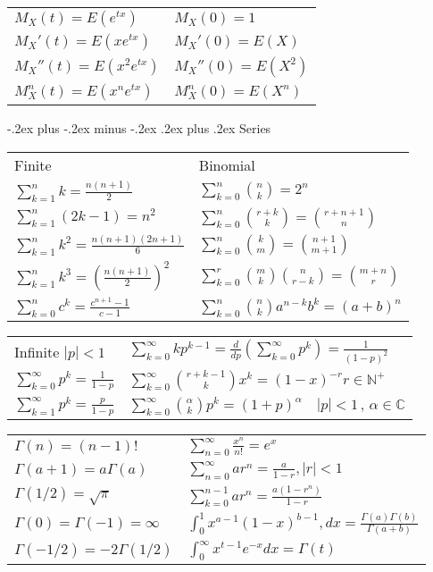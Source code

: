 \documentclass[10pt,landscape]{article}
\makeatletter
\renewcommand{\subsubsection}{\@startsection{subsubsection}{3}{0mm}%
                                {-.2ex plus -.2ex minus -.2ex}%
                                {.2ex plus .2ex}%
                                {\normalfont\small\bfseries}}
\makeatother
\begin{document}
\begin{multicols}{1}
\begin{tabular}{ l|l }
$M_X(t)=E(e^{tx})$   & $M_X(0)=1$ \\
$M_X'(t)=E(xe^{tx})$  & $M_X'(0)=E(X)$  \\ 
$M_X''(t)=E(x^2e^{tx})$ & $M_X''(0)=E(X^2)$ \\
$M_X^n(t)=E(x^ne^{tx})$ & $M_X^n(0)=E(X^n)$
\end{tabular}

  \subsubsection{Series}

\begin{tabular}{ l|l }
Finite                                    & Binomial \\
$\sum_{k=1}^n k=\frac{n(n+1)}{2}$         & $\sum_{k=0}^n \binom{n}{k} = 2^n$ \\
$\sum_{k=1}^n (2k-1)=n^2$                 & $\sum_{k=0}^n \binom{r+k}{k}=\binom{r+n+1}{n}$ \\
$\sum_{k=1}^n k^2=\frac{n(n+1)(2n+1)}{6}$ & $\sum_{k=0}^n \binom{k}{m}=\binom{n+1}{m+1}$ \\
$\sum_{k=1}^n k^3=(\frac{n(n+1)}{2})^2$   & $\sum_{k=0}^r \binom{m}{k}\binom{n}{r-k}=\binom{m+n}{r}$ \\
$\sum_{k=0}^n c^k=\frac{c^{n+1}-1}{c-1}$  & $\sum_{k=0}^n \binom{n}{k}a^{n-k}b^k = (a+b)^n$
\end{tabular}

\begin{tabular}{ l|l }
Infinite $|p|<1$                        & $\sum_{k=0}^\infty kp^{k-1}=\frac{d}{dp}\left(\sum_{k=0}^\infty p^k\right)=\frac{1}{(1-p)^2}$ \\
$\sum_{k=0}^\infty p^k = \frac{1}{1-p}$ & $\sum_{k=0}^\infty \binom{r+k-1}{k} x^k = (1-x)^{-r} r\in\mathbb N^+$ \\
$\sum_{k=1}^\infty p^k = \frac{p}{1-p}$ & $\sum_{k=0}^\infty \binom{\alpha}{k} p^k
    = (1+p)^\alpha \quad |p|<1\,,\,\alpha \in \mathbb C$
\end{tabular}

\begin{tabular}{ l|l }
$\Gamma(n)=(n-1)!$           & $\sum_{n=0}^{\infty}\frac{x^n}{n!}=e^x$ \\
$\Gamma(a+1)=a\Gamma(a)$     & $\sum_{n=0}^{\infty}{ar^n}=\frac{a}{1-r}, |r|<1$ \\
$\Gamma(1/2)=\sqrt\pi$       & $\sum_{k=0}^{n-1}{ar^n}=\frac{a(1-r^n)}{1-r}$ \\
$\Gamma(0)=\Gamma(-1)=\infty$& $\int_0^1 x^{a - 1}(1-x)^{b-1}, dx = \frac{\Gamma(a)\Gamma(b)}{\Gamma(a+b)}$ \\
$\Gamma(-1/2)=-2\Gamma(1/2)$ & $\int_0^\infty x^{t-1}e^{-x}dx = \Gamma(t)$ 
\end{tabular}



\end{multicols}
\end{document}
